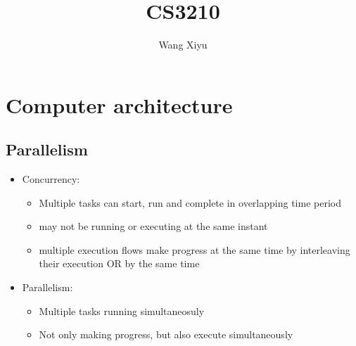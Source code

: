 \documentclass{article}
\begin{document}
\title{CS3210}
\author{
  Wang Xiyu
}
\maketitle
\section{Computer architecture}
\subsection{Parallelism}
\begin{itemize}
    \item Concurrency:
    \begin{itemize}
        \item Multiple tasks can start, run and complete in overlapping time period
        \item may not be running or executing at the same instant
        \item multiple execution flows make progress at the same time by interleaving their execution OR by the same time
    \end{itemize} 
    \item Parallelism:
    \begin{itemize}
        \item Multiple tasks running simultaneosuly
        \item Not only making progress, but also execute simultaneously
    \end{itemize}
\end{itemize}
\end{document}
